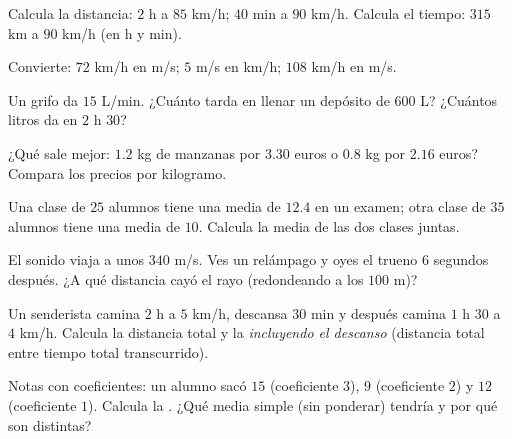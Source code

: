 \begin{exercise}[$\star$]\label{exo:g8:speed:2}
Calcula la distancia: $2$ h a $85$ km/h; $40$ min a $90$ km/h.
Calcula el tiempo: $315$ km a $90$ km/h (en h y min).
\end{exercise}

\begin{exercise}[$\star$]\label{exo:g8:speed:3}
Convierte: $72$ km/h en m/s; $5$ m/s en km/h; $108$ km/h en m/s.
\end{exercise}

\begin{exercise}[$\star$]\label{exo:g8:speed:4}
Un grifo da $15$ L/min. ¿Cuánto tarda en llenar un depósito de $600$ L? ¿Cuántos
litros da en $2$ h $30$?
\end{exercise}

\begin{exercise}[$\star$]\label{exo:g8:speed:5}
¿Qué sale mejor: $1.2$ kg de manzanas por $3.30$ euros o
$0.8$ kg por $2.16$ euros? Compara los precios por kilogramo.
\end{exercise}

\begin{exercise}[$\star$]\label{exo:g8:speed:6}
Una clase de $25$ alumnos tiene una media de $12.4$ en un examen; otra
clase de $35$ alumnos tiene una media de $10$. Calcula la media de
las dos clases juntas.
\end{exercise}

\begin{exercise}[$\star$]\label{exo:g8:speed:7}
El sonido viaja a unos $340$ m/s. Ves un relámpago y oyes
el trueno $6$ segundos después. ¿A qué distancia cayó el rayo
(redondeando a los $100$ m)?
\end{exercise}

\begin{exercise}[$\star\star$]\label{exo:g8:speed:8}
Un senderista camina $2$ h a $5$ km/h, descansa $30$ min y después camina $1$ h $30$
a $4$ km/h. Calcula la distancia total y la 
\emph{incluyendo el descanso} (distancia total entre tiempo total transcurrido).
\end{exercise}

\begin{exercise}[$\star\star$]\label{exo:g8:speed:9}
Notas con coeficientes: un alumno sacó $15$ (coeficiente $3$), $9$
(coeficiente $2$) y $12$ (coeficiente $1$). Calcula la . ¿Qué media simple (sin ponderar) tendría y por qué
son distintas?
\end{exercise}

